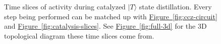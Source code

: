 \documentclass[twocolumn,accepted=2019-03-30]{quantumarticle}
\newcommand{\fig}[1]{\hyperref[fig:#1]{Figure~\ref*{fig:#1}}}
\begin{document}
\begin{figure}
  \label{fig:full-slices}
  \caption{
    Time slices of activity during catalyzed $|T\rangle$ state distillation.
    Every step being performed can be matched up with \fig{ccz-circuit} and \fig{catalysis-slices}.
    See \fig{full-3d} for the 3D topological diagram these time slices come from.
  }
\end{figure}
\end{document}
